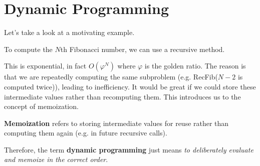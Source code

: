 \section{Dynamic Programming}
  
  Let's take a look at a motivating example. 

  \begin{example}
    To compute the $N$th Fibonacci number, we can use a recursive method. 
    \begin{algorithm}[H]
      \caption{}
      \label{alg:recfib}
      \begin{algorithmic}
        \State 
            \State {}
            \State {}
          \Else 
            \State {}
          \EndIf
        \EndFunction
      \end{algorithmic}
    \end{algorithm}
  \end{example}

  This is exponential, in fact $O(\varphi^N)$ where $\varphi$ is the golden ratio. The reason is that we are repeatedly computing the same subproblem (e.g. RecFib($N-2$ is computed twice)), leading to inefficiency. It would be great if we could store these intermediate values rather than recomputing them. This introduces us to the concept of memoization. 

  \begin{definition}[Memoization]
    \textbf{Memoization} refers to storing intermediate values for reuse rather than computing them again (e.g. in future recursive calls). 
    
    Therefore, the term \textbf{dynamic programming} just means \textit{to deliberately evaluate and memoize in the correct order}. 
  \end{definition}


